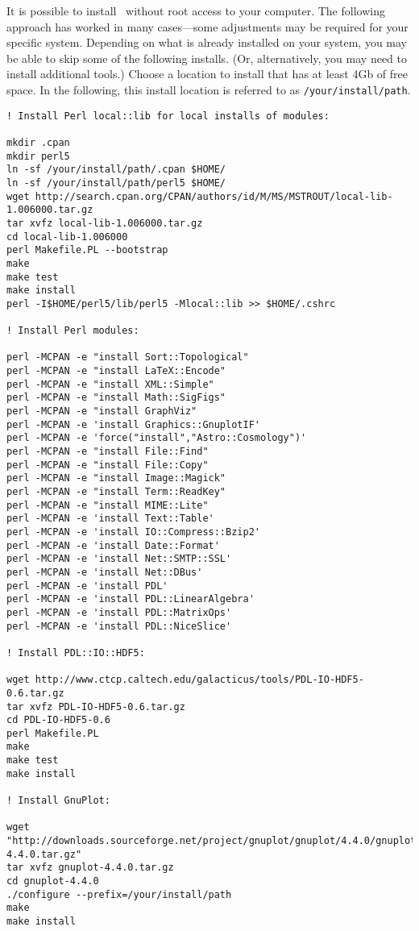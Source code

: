 It is possible to install \glc\ without root access to your computer. The following approach has worked in many cases---some adjustments may be required for your specific system. Depending on what is already installed on your system, you may be able to skip some of the following installs. (Or, alternatively, you may need to install additional tools.) Choose a location to install that has at least 4Gb of free space. In the following, this install location is referred to as {\tt /your/install/path}.

\begin{lstlisting}[language=simple,stringstyle=\ttfamily,commentstyle=\itshape]
! Install Perl local::lib for local installs of modules:

mkdir .cpan
mkdir perl5
ln -sf /your/install/path/.cpan $HOME/
ln -sf /your/install/path/perl5 $HOME/
wget http://search.cpan.org/CPAN/authors/id/M/MS/MSTROUT/local-lib-1.006000.tar.gz
tar xvfz local-lib-1.006000.tar.gz 
cd local-lib-1.006000
perl Makefile.PL --bootstrap
make
make test
make install
perl -I$HOME/perl5/lib/perl5 -Mlocal::lib >> $HOME/.cshrc

! Install Perl modules:

perl -MCPAN -e "install Sort::Topological"
perl -MCPAN -e "install LaTeX::Encode"
perl -MCPAN -e "install XML::Simple"
perl -MCPAN -e "install Math::SigFigs"
perl -MCPAN -e "install GraphViz"
perl -MCPAN -e 'install Graphics::GnuplotIF'
perl -MCPAN -e 'force("install","Astro::Cosmology")'
perl -MCPAN -e "install File::Find"
perl -MCPAN -e "install File::Copy"
perl -MCPAN -e "install Image::Magick"
perl -MCPAN -e "install Term::ReadKey"
perl -MCPAN -e "install MIME::Lite"
perl -MCPAN -e 'install Text::Table'
perl -MCPAN -e 'install IO::Compress::Bzip2'
perl -MCPAN -e 'install Date::Format'
perl -MCPAN -e 'install Net::SMTP::SSL'
perl -MCPAN -e 'install Net::DBus'
perl -MCPAN -e 'install PDL'
perl -MCPAN -e 'install PDL::LinearAlgebra'
perl -MCPAN -e 'install PDL::MatrixOps'
perl -MCPAN -e 'install PDL::NiceSlice'

! Install PDL::IO::HDF5:

wget http://www.ctcp.caltech.edu/galacticus/tools/PDL-IO-HDF5-0.6.tar.gz
tar xvfz PDL-IO-HDF5-0.6.tar.gz
cd PDL-IO-HDF5-0.6
perl Makefile.PL
make
make test
make install

! Install GnuPlot:

wget "http://downloads.sourceforge.net/project/gnuplot/gnuplot/4.4.0/gnuplot-4.4.0.tar.gz"
tar xvfz gnuplot-4.4.0.tar.gz
cd gnuplot-4.4.0
./configure --prefix=/your/install/path
make
make install


\end{lstlisting}
